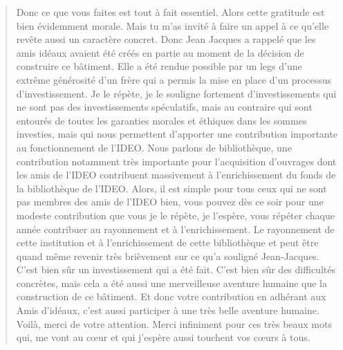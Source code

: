 \begin{quote}
Donc ce que vous faites est tout à fait essentiel. Alors cette gratitude est bien évidemment morale. Mais tu m'as invité à faire un appel à ce qu'elle revête aussi un caractère concret. Donc Jean Jacques a rappelé que les amis idéaux avaient été créés en partie au moment de la décision de construire ce bâtiment. Elle a été rendue possible par un legs d'une extrême générosité d'un frère qui a permis la mise en place d'un processus d'investissement.
Je le répète, je le souligne fortement d'investissements qui ne sont pas des investissements spéculatifs, mais au contraire qui sont entourés de toutes les garanties morales et éthiques dans les sommes investies, mais qui nous permettent d'apporter une contribution importante au fonctionnement de l'IDEO. Nous parlons de bibliothèque, une contribution notamment très importante pour l'acquisition d'ouvrages dont les amis de l'IDEO contribuent massivement à l'enrichissement du fonds de la bibliothèque de l'IDEO.
Alors, il est simple pour tous ceux qui ne sont pas membres des amis de l'IDEO bien, vous pouvez dès ce soir pour une modeste contribution que vous je le répète, je l'espère, vous répéter chaque année contribuer au rayonnement et à l'enrichissement. Le rayonnement de cette institution et à l'enrichissement de cette bibliothèque et peut être quand même revenir très brièvement sur ce qu'a souligné Jean-Jacques.
C'est bien sûr un investissement qui a été fait. C'est bien sûr des difficultés concrètes, mais cela a été aussi une merveilleuse aventure humaine que la construction de ce bâtiment. Et donc votre contribution en adhérant aux Amis d'idéaux, c'est aussi participer à une très belle aventure humaine. Voilà, merci de votre attention. Merci infiniment pour ces très beaux mots qui, me vont au cœur et qui j'espère aussi touchent vos cœurs à tous.
\end{quote}